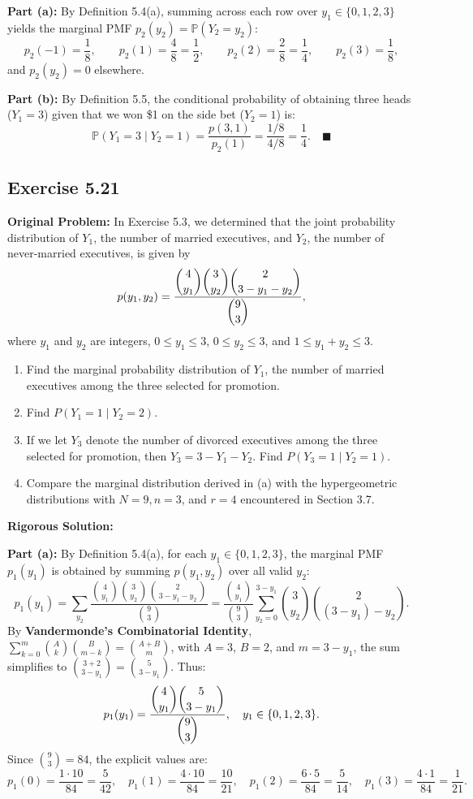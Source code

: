 \documentclass[11pt, letterpaper]{article}
\theoremstyle{definition}
\theoremstyle{remark}
\newcommand{\Prob}{\mathbb{P}}
\begin{document}
\textbf{Part (a):} By Definition 5.4(a), summing across each row over $y_1 \in \{0, 1, 2, 3\}$ yields the marginal PMF $p_2(y_2) = \Prob(Y_2 = y_2)$:
\[ p_2(-1) = \frac{1}{8}, \qquad p_2(1) = \frac{4}{8} = \frac{1}{2}, \qquad p_2(2) = \frac{2}{8} = \frac{1}{4}, \qquad p_2(3) = \frac{1}{8}, \]
and $p_2(y_2) = 0$ elsewhere.

\textbf{Part (b):} By Definition 5.5, the conditional probability of obtaining three heads ($Y_1 = 3$) given that we won \$1 on the side bet ($Y_2 = 1$) is:
\[ \Prob(Y_1 = 3 \mid Y_2 = 1) = \frac{p(3, 1)}{p_2(1)} = \frac{1/8}{4/8} = \frac{1}{4}. \quad \blacksquare \]

\subsection{Exercise 5.21}

\textbf{Original Problem:}
In Exercise 5.3, we determined that the joint probability distribution of $Y_1$, the number of married executives, and $Y_2$, the number of never-married executives, is given by
\[ p(y_1, y_2) = \frac{\dbinom{4}{y_1}\dbinom{3}{y_2}\dbinom{2}{3 - y_1 - y_2}}{\dbinom{9}{3}}, \]
where $y_1$ and $y_2$ are integers, $0 \le y_1 \le 3$, $0 \le y_2 \le 3$, and $1 \le y_1 + y_2 \le 3$.
\begin{enumerate}[label=\textbf{\alph*}]
    \item Find the marginal probability distribution of $Y_1$, the number of married executives among the three selected for promotion.
    \item Find $P(Y_1 = 1 \mid Y_2 = 2)$.
    \item If we let $Y_3$ denote the number of divorced executives among the three selected for promotion, then $Y_3 = 3 - Y_1 - Y_2$. Find $P(Y_3 = 1 \mid Y_2 = 1)$.
    \item Compare the marginal distribution derived in (a) with the hypergeometric distributions with $N = 9, n = 3$, and $r = 4$ encountered in Section 3.7.
\end{enumerate}

\textbf{Rigorous Solution:}

\textbf{Part (a):} By Definition 5.4(a), for each $y_1 \in \{0, 1, 2, 3\}$, the marginal PMF $p_1(y_1)$ is obtained by summing $p(y_1, y_2)$ over all valid $y_2$:
\[ p_1(y_1) = \sum_{y_2} \frac{\binom{4}{y_1}\binom{3}{y_2}\binom{2}{3 - y_1 - y_2}}{\binom{9}{3}} = \frac{\binom{4}{y_1}}{\binom{9}{3}} \sum_{y_2=0}^{3-y_1} \binom{3}{y_2}\binom{2}{(3 - y_1) - y_2}. \]
By \textbf{Vandermonde's Combinatorial Identity}, $\sum_{k=0}^m \binom{A}{k}\binom{B}{m-k} = \binom{A+B}{m}$, with $A = 3$, $B = 2$, and $m = 3 - y_1$, the sum simplifies to $\binom{3+2}{3-y_1} = \binom{5}{3-y_1}$. Thus:
\[ p_1(y_1) = \frac{\dbinom{4}{y_1}\dbinom{5}{3 - y_1}}{\dbinom{9}{3}}, \quad y_1 \in \{0, 1, 2, 3\}. \]
Since $\binom{9}{3} = 84$, the explicit values are:
\[ p_1(0) = \frac{1 \cdot 10}{84} = \frac{5}{42}, \quad p_1(1) = \frac{4 \cdot 10}{84} = \frac{10}{21}, \quad p_1(2) = \frac{6 \cdot 5}{84} = \frac{5}{14}, \quad p_1(3) = \frac{4 \cdot 1}{84} = \frac{1}{21}. \]
\end{document}
